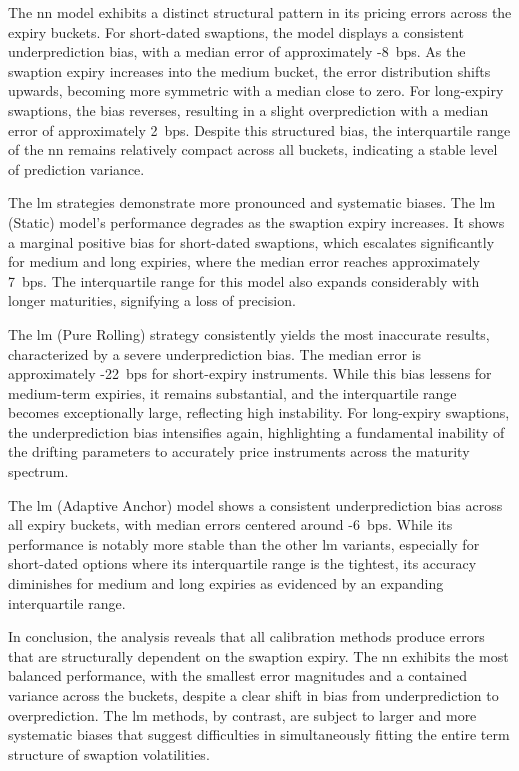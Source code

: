 The \ac{nn} model exhibits a distinct structural pattern in its pricing errors across the expiry buckets. For short-dated swaptions, the model displays a consistent underprediction bias, with a median error of approximately -8~\ac{bps}. As the swaption expiry increases into the medium bucket, the error distribution shifts upwards, becoming more symmetric with a median close to zero. For long-expiry swaptions, the bias reverses, resulting in a slight overprediction with a median error of approximately 2~\ac{bps}. Despite this structured bias, the interquartile range of the \ac{nn} remains relatively compact across all buckets, indicating a stable level of prediction variance.

The \ac{lm} strategies demonstrate more pronounced and systematic biases. The \ac{lm} (Static) model's performance degrades as the swaption expiry increases. It shows a marginal positive bias for short-dated swaptions, which escalates significantly for medium and long expiries, where the median error reaches approximately 7~\ac{bps}. The interquartile range for this model also expands considerably with longer maturities, signifying a loss of precision.

The \ac{lm} (Pure Rolling) strategy consistently yields the most inaccurate results, characterized by a severe underprediction bias. The median error is approximately -22~\ac{bps} for short-expiry instruments. While this bias lessens for medium-term expiries, it remains substantial, and the interquartile range becomes exceptionally large, reflecting high instability. For long-expiry swaptions, the underprediction bias intensifies again, highlighting a fundamental inability of the drifting parameters to accurately price instruments across the maturity spectrum.

The \ac{lm} (Adaptive Anchor) model shows a consistent underprediction bias across all expiry buckets, with median errors centered around -6~\ac{bps}. While its performance is notably more stable than the other \ac{lm} variants, especially for short-dated options where its interquartile range is the tightest, its accuracy diminishes for medium and long expiries as evidenced by an expanding interquartile range.

In conclusion, the analysis reveals that all calibration methods produce errors that are structurally dependent on the swaption expiry. The \ac{nn} exhibits the most balanced performance, with the smallest error magnitudes and a contained variance across the buckets, despite a clear shift in bias from underprediction to overprediction. The \ac{lm} methods, by contrast, are subject to larger and more systematic biases that suggest difficulties in simultaneously fitting the entire term structure of swaption volatilities.

